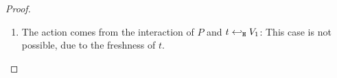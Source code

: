 \begin{proof}
\begin{enumerate}[1.]
\begin{enumerate}
\begin{eqnarray*}
\begin{array}{crll}
									\Hby{} &&&
									\newsp{\widetilde{m_2}}{Q_2 \Par \ftrigger{t}{V_2}{U}}
									\\
									{\hby{\bactinp{t}{m}}}& & &
									\newsp{\widetilde{m_2}}{Q_2 \Par \newsp{s}{\binp{s}{y} \mapchar{U}{y} \Par \bout{\dual{s}}{V_2} \inact}}
									\\
									\Hby{} & \Delta_4 & \proves & Q'
								\end{array}
							\end{eqnarray*}
							The conclusion is immediate from \eqref{proof:trig_equiv33}.


				\item The action comes from the interaction of $P$ and $t \hookleftarrow_{\mathtt{H}} V_1$: This case is not possible, due to the freshness of $t$.
				\end{enumerate}



\end{enumerate}
\end{proof}
